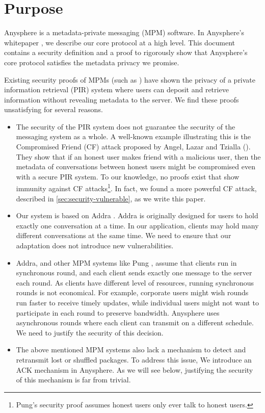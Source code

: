 \section{Purpose}
\label{sec:purpose}
Anysphere is a metadata-private messaging (MPM) software. In Anysphere's whitepaper \cite[Section 3]{whitepaper}, we describe our core protocol at a high level. This document contains a security definition and a proof to rigorously show that Anysphere's core protocol satisfies the metadata privacy we promise.

Existing security proofs of MPMs (such as \cite{corrigan2010dissent, corrigan2015riposte, angel2016unobservable, ahmad2021addra}) have shown the privacy of a private information retrieval (PIR) system where users can deposit and retrieve information without revealing metadata to the server. We find these proofs unsatisfying for several reasons.
\begin{itemize}
    \item The security of the PIR system does not guarantee the security of the messaging system as a whole. A well-known example illustrating this is the Compromised Friend (CF) attack proposed by Angel, Lazar and Tzialla (\cite{angel2018cf}). They show that if an honest user makes friend with a malicious user, then the metadata of conversations between honest users might be compromised even with a secure PIR system. To our knowledge, no proofs exist that show immunity against CF attacks\footnote{Pung's security proof \cite[Appendix C]{angel2018thesis} assumes honest users only ever talk to honest users.}. In fact, we found a more powerful CF attack, described in \cref{sec:security-vulnerable}, as we write this paper.
    
    \item Our system is based on Addra \cite{ahmad2021addra}. Addra is originally designed for users to hold exactly one conversation at a time. In our application, clients may hold many different conversations at the same time. We need to ensure that our adaptation does not introduce new vulnerabilities.
    
    \item Addra, and other MPM systems like Pung \cite{angel2016unobservable}, assume that clients run in synchronous round, and each client sends exactly one message to the server each round. As clients have different level of resources, running synchronous rounds is not economical. For example, corporate users might wish rounds run faster to receive timely updates, while individual users might not want to participate in each round to preserve bandwidth. Anysphere uses asynchronous rounds where each client can transmit on a different schedule. We need to justify the security of this decision.
    
    \item The above mentioned MPM systems also lack a mechanism to detect and retransmit lost or shuffled packages. To address this issue, We introduce an ACK mechanism in Anysphere. As we will see below, justifying the security of this mechanism is far from trivial.
\end{itemize}

